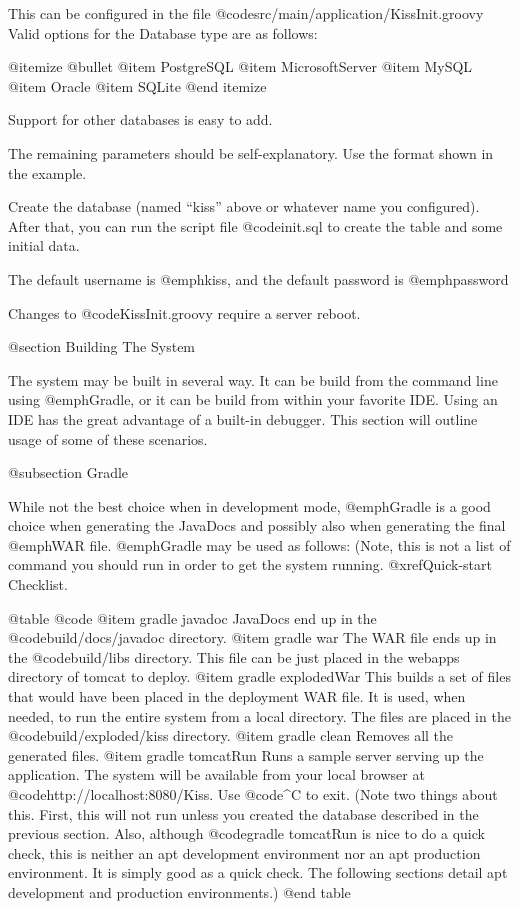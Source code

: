 This can be configured in the file @code{src/main/application/KissInit.groovy}
Valid options for the Database type are as follows:

@itemize @bullet
@item
PostgreSQL
@item
MicrosoftServer
@item
MySQL
@item
Oracle
@item
SQLite
@end itemize

Support for other databases is easy to add.

The remaining parameters should be self-explanatory.  Use the format
shown in the example.

Create the database (named ``kiss'' above or whatever name you
configured).  After that, you can run the script file @code{init.sql}
to create the table and some initial data.

The default username is @emph{kiss}, and the default password is
@emph{password}

Changes to  @code{KissInit.groovy} require a server reboot.

@section Building The System

The system may be built in several way.  It can be build from the
command line using @emph{Gradle}, or it can be build from within your
favorite IDE.  Using an IDE has the great advantage of a built-in
debugger.  This section will outline usage of some of these scenarios.

@subsection Gradle 

While not the best choice when in development mode, @emph{Gradle} is a
good choice when generating the JavaDocs and possibly also when
generating the final @emph{WAR} file.  @emph{Gradle} may be used as follows:
(Note, this is not a list of command you should run in order to get the system running.  
@xref{Quick-start Checklist}.

@table @code
@item gradle javadoc
JavaDocs end up in the @code{build/docs/javadoc} directory.
@item gradle war
The WAR file ends up in the @code{build/libs} directory.  
This file can be just placed in the webapps directory of tomcat to deploy.
@item gradle explodedWar
This builds a set of files that would have been placed in the deployment WAR file.  It is used, when needed,
to run the entire system from a local directory.  The files are placed in the @code{build/exploded/kiss}
directory.
@item gradle clean
Removes all the generated files.
@item gradle tomcatRun
Runs a sample server serving up the application.  The system will be
available from your local browser at
@code{http://localhost:8080/Kiss}.  Use @code{^C} to exit.
(Note two things about this.  First, this will not run unless you created the database described in the previous section.
Also, although @code{gradle tomcatRun} is nice to do a quick check, this is neither an apt development environment nor
an apt production environment.  It is simply good as a quick check.  The following sections detail apt development and production environments.)  
@end table

